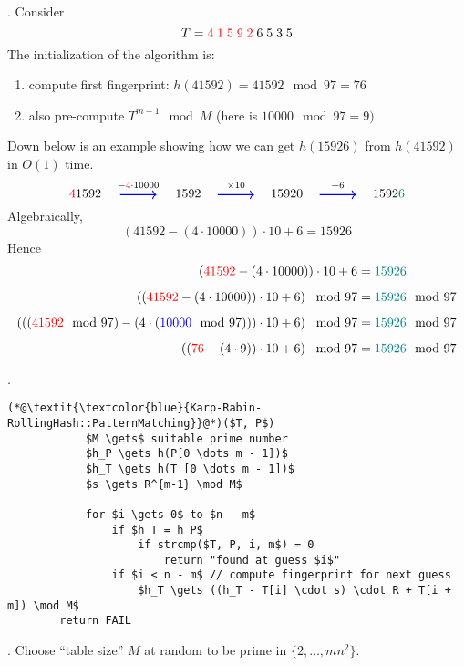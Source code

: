 \documentclass{article}
\begin{document}
\begin{examplee}[].
    Consider 
    \[ T = \textcolor{red}{ 4 \; 1 \; 5 \; 9 \; 2 } \; 6 \; 5 \; 3 \; 5 \]
    The initialization of the algorithm is: \begin{enumerate}
        \item compute first fingerprint: $h(41592) = 41592 \mod 97 = 76$ 
        \item also pre-compute $T^{m - 1} \mod M$ (here is $10000 \mod 97 = 9)$. 
    \end{enumerate}
    Down below is an example showing how we can get $h(15926)$ from $h(41592)$ in $O(1)$ time. 
    \[
        \textcolor{red}{4}1592 \quad
        \stackrel{ -\textcolor{red}{4} \cdot 10000 }{ \mathrel{\tikz[baseline=-0.5ex]\draw[->, blue, thick] (0,0) -- (1,0); } } 
        \quad 1592 \quad 
        \stackrel{ \times 10 }{ \mathrel{\tikz[baseline=-0.5ex]\draw[->, blue, thick] (0,0) -- (1,0); } } 
        \quad 15920 \quad 
        \stackrel{ + 6 }{ \mathrel{\tikz[baseline=-0.5ex]\draw[->, blue, thick] (0,0) -- (1,0); } } 
        \quad 1592\textcolor{teal}{6}
    \]
    Algebraically, 
    \[ ( 41592 - ( 4 \cdot 10000 ) ) \cdot 10 + 6 = 15926 \]
    Hence \vspace{-0.75cm} \begin{align*}
        \left( \textcolor{red}{41592} - (4 \cdot 10000) \right) \cdot 10 + 6 &= \textcolor{teal}{15926} \\[5pt]
        \left( \left( \textcolor{red}{41592} - (4 \cdot 10000) \right) \cdot 10 + 6 \right) \mod 97 &= \textcolor{teal}{15926} \mod 97 \\[5pt]
        \left( \left( \left( \textcolor{red}{41592} \mod 97 \right) - (4 \cdot \left( \textcolor{blue}{10000} \mod 97 \right)) \right) \cdot 10 + 6 \right) \mod 97 &= \textcolor{teal}{15926} \mod 97 \\[5pt]
        \left( \left( \textcolor{red}{76} - (4 \cdot 9) \right) \cdot 10 + 6 \right) \mod 97 &= \textcolor{teal}{15926} \mod 97
    \end{align*}
\end{examplee}

\begin{codes}[].
    \begin{lstlisting}[style=cppstyle]
        (*@\textit{\textcolor{blue}{Karp-Rabin-RollingHash::PatternMatching}}@*)($T, P$)  
            $M \gets$ suitable prime number  
            $h_P \gets h(P[0 \dots m - 1])$  
            $h_T \gets h(T [0 \dots m - 1])$  
            $s \gets R^{m-1} \mod M$  
        
            for $i \gets 0$ to $n - m$  
                if $h_T = h_P$  
                    if strcmp($T, P, i, m$) = 0  
                        return "found at guess $i$"  
                if $i < n - m$ // compute fingerprint for next guess 
                    $h_T \gets ((h_T - T[i] \cdot s) \cdot R + T[i + m]) \mod M$  
        return FAIL 
    \end{lstlisting}        
    \begin{comm}[].
        Choose ``table size'' $M$ at random to be prime in $\{ 2, \ldots, m n^2 \}$. 
    \end{comm}
\end{codes}
\end{document}

